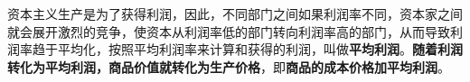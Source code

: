 {资本主义生产是为了获得利润，因此，不同部门之间如果利润率不同，资本家之间就会展开激烈的竞争，使资本从利润率低的部门转向利润率高的部门，从而导致}利润率趋于平均化{，按照平均利润率来计算和获得的利润，叫做}\textbf{平均利润}{。}\textbf{随着利润转化为平均利润，商品价值就转化为生产价格}{，即}\textbf{商品的成本价格加平均利润}{。}
